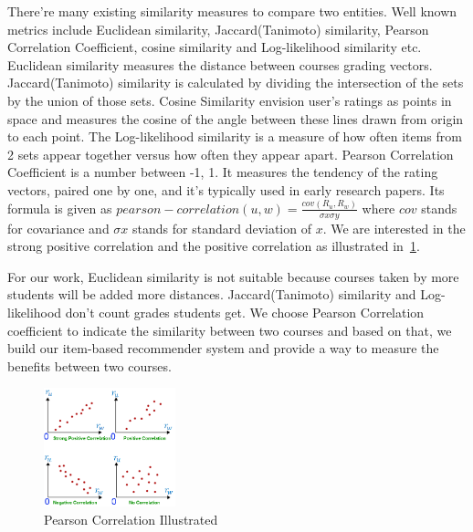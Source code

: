 There’re many existing similarity measures to compare two entities. Well known metrics include Euclidean similarity, Jaccard(Tanimoto) similarity, Pearson Correlation Coefficient, cosine similarity and Log-likelihood similarity etc. Euclidean similarity measures the distance between courses grading vectors. Jaccard(Tanimoto) similarity is calculated by dividing the intersection of the sets by the union of those sets\cite{sandvig2005aacorn}. Cosine Similarity envision user’s ratings as points in space and measures the cosine of the angle between these lines drawn from origin to each point. The Log-likelihood similarity is a measure of how often items from 2 sets appear together versus how often they appear apart. Pearson Correlation Coefficient is a number between -1, 1. It measures the tendency of the rating vectors, paired one by one, and it’s typically used in early research papers. Its formula is given as $pearson-correlation(u,w) = \frac{cov(R_u,R_w)}{\sigma x \sigma y} $ where $cov$ stands for covariance and $\sigma x$ stands for standard deviation of $x$. We are interested in the strong positive correlation and the positive correlation as illustrated in~\ref{fig:psc}.

For our work, Euclidean similarity is not suitable because courses taken by more students will be added more distances. Jaccard(Tanimoto) similarity and Log-likelihood don’t count grades students get. We choose Pearson Correlation coefficient to indicate the similarity between two courses and based on that, we build our item-based recommender system and provide a way to measure the benefits between two courses.
\begin{figure}[h]
 \centering %
 \includegraphics[width=1.5in]{figs/psc_illustrated}
\caption{Pearson Correlation Illustrated}
 \label{fig:psc}
\end{figure}


